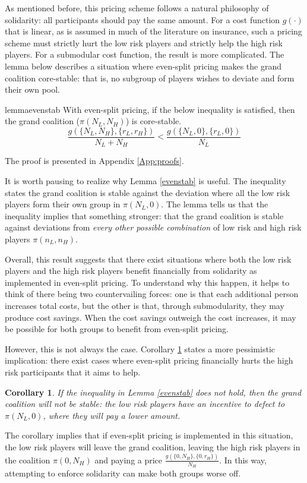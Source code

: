 \documentclass[sigconf]{acmart}
\newtheorem{corollary}{Corollary}
\newcommand{\NL}[0]{\ensuremath{N_L}}
\newcommand{\NH}[0]{\ensuremath{N_H}}
\newcommand{\nL}[0]{\ensuremath{n_L}}
\newcommand{\nH}[0]{\ensuremath{n_H}}
\newcommand{\rL}[0]{\ensuremath{r_L}}
\newcommand{\rH}[0]{\ensuremath{r_H}}
\newcommand{\cost}[0]{\ensuremath{g}}
\newcommand{\cd}[0]{\cdot}
\begin{document}
As mentioned before, this pricing scheme follows a natural philosophy of solidarity: all participants should pay the same amount. For a cost function $\cost(\cd)$ that is linear, as is assumed in much of the literature on insurance, such a pricing scheme must strictly hurt the low risk players and strictly help the high risk players. For a submodular cost function, the result is more complicated. The lemma below describes a situation where even-split pricing makes the grand coalition core-stable: that is, no subgroup of players wishes to deviate and form their own pool. 

\begin{restatable}{lemma}{evenstab}
\label{evenstab}
With even-split pricing, if the below inequality is satisfied, then the grand coalition ($\pi(\NL, \NH)$) is core-stable.
$$\frac{\cost(\{\NL,\NH \}, \{\rL, \rH\})}{\NL + \NH} < \frac{\cost(\{\NL,0 \}, \{\rL,0\})}{\NL }$$
\end{restatable}
The proof is presented in Appendix \ref{App:proofs}.

It is worth pausing to realize why Lemma \ref{evenstab} is useful. The inequality states the grand coalition is stable against the deviation where all the low risk players form their own group in $\pi(\NL, 0)$. The lemma tells us that the inequality implies that something stronger: that the grand coalition is stable against deviations from \emph{every other possible combination} of low risk and high risk players $\pi(\nL, \nH)$.

Overall, this result suggests that there exist situations where both the low risk players and the high risk players benefit financially from solidarity as implemented in even-split pricing. To understand why this happen, it helps to think of there being two countervailing forces: one is that each additional person increases total costs, but the other is that, through submodularity, they may produce cost savings. When the cost savings outweigh the cost increases, it may be possible for both groups to benefit from even-split pricing. 

However, this is not always the case. Corollary \ref{negative} states a more pessimistic implication: there exist cases where even-split pricing financially hurts the high risk participants that it aims to help. 

\begin{corollary}\label{negative}
If the inequality in Lemma \ref{evenstab} does not hold, then the grand coalition will not be stable: the low risk players have an incentive to defect to $\pi(\NL, 0)$, where they will pay a lower amount. 
\end{corollary}
The corollary implies that if even-split pricing is implemented in this situation, the low risk players will leave the grand coalition, leaving the high risk players in the coalition $\pi(0, \NH)$ and paying a price $\frac{\cost(\{0,\NH \}, \{0, \rH\})}{\NH}$. In this way, attempting to enforce solidarity can make both groups worse off. 
\end{document}
